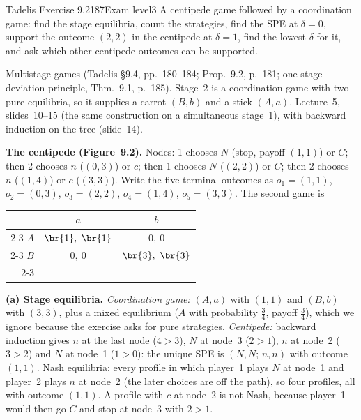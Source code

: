 \begin{exsol}{Tadelis Exercise 9.2}{187}{Exam level}{3}
\asked A centipede game followed by a coordination game: find the stage equilibria, count the
strategies, find the SPE at $\delta = 0$, support the outcome $(2,2)$ in the centipede at $\delta = 1$, find the
lowest $\delta$ for it, and ask which other centipede outcomes can be supported.

\method Multistage games (Tadelis \S9.4, pp.~180--184; Prop.~9.2, p.~181; one-stage deviation principle,
Thm.~9.1, p.~185). Stage~2 is a coordination game with two pure equilibria, so it supplies a carrot
$(B,b)$ and a stick $(A,a)$. Lecture~5, slides~10--15 (the same construction on a simultaneous stage~1), with
backward induction on the tree (slide~14).

\solution
\textbf{The centipede (Figure~9.2).} Nodes: 1 chooses $N$ (stop, payoff $(1,1)$) or $C$; then 2 chooses
$n$ ($(0,3)$) or $c$; then 1 chooses $N$ ($(2,2)$) or $C$; then 2 chooses $n$ ($(1,4)$) or $c$ ($(3,3)$). Write
the five terminal outcomes as $o_1 = (1,1)$, $o_2 = (0,3)$, $o_3 = (2,2)$, $o_4 = (1,4)$, $o_5 = (3,3)$.
The second game is
\begin{center}
\begin{tabular}{r|c|c|}
\multicolumn{1}{r}{} & \multicolumn{1}{c}{$a$} & \multicolumn{1}{c}{$b$}\\ \cline{2-3}
$A$ & $\br{1},\ \br{1}$ & $0,\ 0$ \\ \cline{2-3}
$B$ & $0,\ 0$ & $\br{3},\ \br{3}$ \\ \cline{2-3}
\end{tabular}
\end{center}

\textbf{(a) Stage equilibria.} \emph{Coordination game:} $(A,a)$ with $(1,1)$ and $(B,b)$ with $(3,3)$, plus a
mixed equilibrium ($A$ with probability $\frac34$, payoff $\frac34$), which we ignore because the
exercise asks for pure strategies. \emph{Centipede:} backward induction gives $n$ at the last node ($4>3$),
$N$ at node~3 ($2>1$), $n$ at node~2 ($3>2$) and $N$ at node~1 ($1>0$): the unique SPE is $(N,N;\,n,n)$ with
outcome $(1,1)$. Nash equilibria: every profile in which player~1 plays $N$ at node~1 and player~2 plays $n$
at node~2 (the later choices are off the path), so four profiles, all with outcome $(1,1)$. A profile with $c$
at node~2 is not Nash, because player~1 would then go $C$ and stop at node~3 with $2 > 1$.


\end{exsol}
